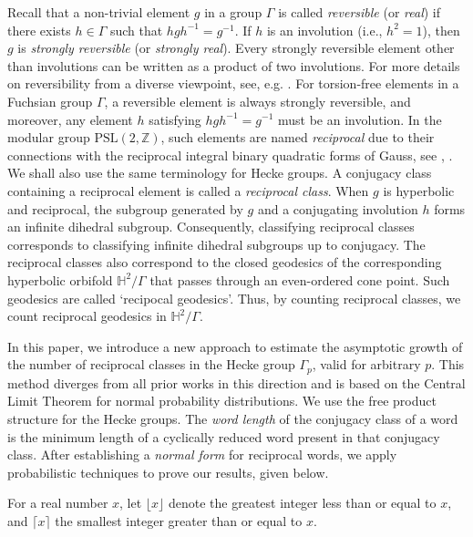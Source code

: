 \documentclass[11pt]{amsart}
\numberwithin{equation}{section}
\numberwithin{equation}{section}
\begin{document}
 Recall that a non-trivial element \( g \) in a group \( \Gamma \) is called \emph{reversible} (or \emph{real}) if there exists \( h \in \Gamma \) such that \( hgh^{-1} = g^{-1} \). If \( h \) is an involution (i.e., \( h^2 = 1 \)), then \( g \) is \emph{strongly reversible} (or \emph{strongly real}). Every strongly reversible element other than involutions can be written as a product of two involutions. For more details on reversibility from a diverse viewpoint, see, e.g. \cite{BR, Sa, OS}. For torsion-free elements in a Fuchsian group $\Gamma$, a reversible element is always strongly reversible, and moreover, any element \( h \) satisfying \( hgh^{-1} = g^{-1} \) must be an involution. In the modular group \( \mathrm{PSL}(2, \mathbb{Z}) \), such elements are named \emph{reciprocal} due to 
their connections with the reciprocal integral binary quadratic forms of Gauss, see \cite{Sa}, \cite{bppz}. We shall also use the same terminology for Hecke groups. A conjugacy class containing a reciprocal element is called a \emph{reciprocal class}. When $g$ is hyperbolic and reciprocal, the subgroup generated by $g$ and a conjugating involution $h$ forms an infinite dihedral subgroup. Consequently, classifying reciprocal classes corresponds to classifying infinite dihedral subgroups up to conjugacy. The reciprocal classes also correspond to the closed geodesics of the corresponding hyperbolic orbifold $\mathbb{H}^2\slash \Gamma$ that passes through an even-ordered cone point. Such geodesics are called `recipocal geodesics'. Thus,  by counting reciprocal classes, we count reciprocal geodesics in $ \mathbb{H}^2\slash \Gamma$.

\medskip In this paper, we introduce a new approach to estimate the asymptotic growth of the number of  reciprocal classes in the Hecke group \( \Gamma_p \), valid for arbitrary \( p \). This method diverges from all prior works in this direction and is based on the Central Limit Theorem for normal  probability distributions. We use the free product structure for the Hecke groups. The  \emph{word length} of the conjugacy class of a word is the minimum length of a cyclically reduced word present in that conjugacy class. After establishing a \emph{normal form} for reciprocal words, we apply probabilistic techniques to prove our results, given below. 


For a real number \( x \), let \( \lfloor x \rfloor \) denote the greatest integer less than or equal to \( x \), and \( \lceil x \rceil \) the smallest integer greater than or equal to \( x \). 
\end{document}
